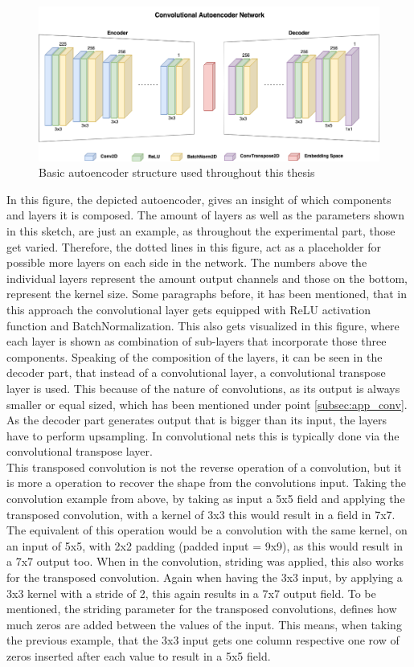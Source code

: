 \begin{figure}[htb!]
	\caption{Basic autoencoder structure used throughout this thesis}
	\label{fig:app_autoencoder}
	\centering
	\includegraphics[width=\textwidth]{images/approach/autoencoder.png}
\end{figure}

In this figure, the depicted autoencoder, gives an insight of which components and layers it is composed. The amount of layers as well as the parameters shown in this sketch, are just an example, as throughout the experimental part, those get varied. Therefore, the dotted lines in this figure, act as a placeholder for possible more layers on each side in the network. The numbers above the individual layers represent the amount output channels and those on the bottom, represent the kernel size. Some paragraphs before, it has been mentioned, that in this approach the convolutional layer gets equipped with ReLU activation function and BatchNormalization. This also gets visualized in this figure, where each layer is shown as combination of sub-layers that incorporate those three components. Speaking of the composition of the layers, it can be seen in the decoder part, that instead of a convolutional layer, a convolutional transpose layer is used. This because of the nature of convolutions, as its output is always smaller or equal sized, which has been mentioned under point \ref{subsec:app_conv}. As the decoder part generates output that is bigger than its input, the layers have to perform upsampling. In convolutional nets this is typically done via the convolutional transpose layer.\\
This transposed convolution is not the reverse operation of a convolution, but it is more a operation to recover the shape from the convolutions input. \cite{dumoulin2018guideconv} Taking the convolution example from above, by taking as input a 5x5 field and applying the transposed convolution, with a kernel of 3x3 this would result in a field in 7x7. The equivalent of this operation would be a convolution with the same kernel, on an input of 5x5, with 2x2 padding (padded input = 9x9), as this would result in a 7x7 output too.
When in the convolution, striding was applied, this also works for the transposed convolution. Again when having the 3x3 input, by applying a 3x3 kernel with a stride of 2, this again results in a 7x7 output field. To be mentioned, the striding parameter for the transposed convolutions, defines how much zeros are added between the values of the input. This means, when taking the previous example, that the 3x3 input gets one column respective one row of zeros inserted after each value to result in a 5x5 field.

